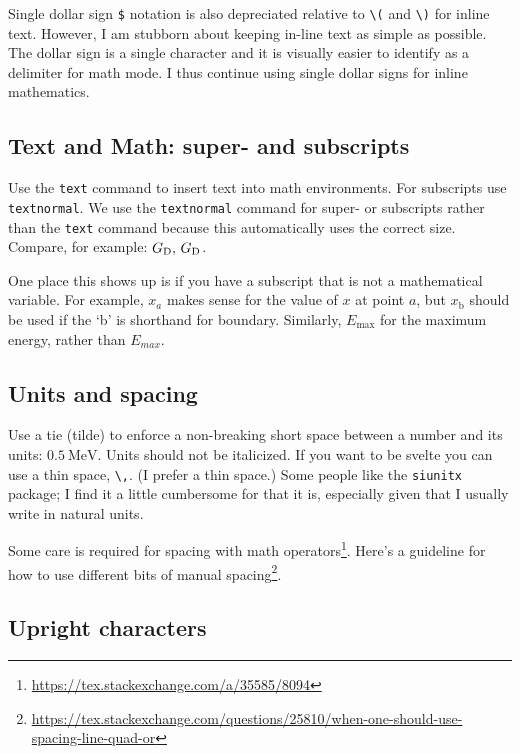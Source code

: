 Single dollar sign \verb!$! notation is also depreciated relative to \verb!\(! and \verb!\)! for inline text. However, I am stubborn about keeping in-line text as simple as possible. The dollar sign is a single character and it is visually easier to identify as a delimiter for math mode. I thus continue using single dollar signs for inline mathematics. 


\subsection{Text and Math: super- and subscripts}

Use the \texttt{text} command to insert text into math environments. For subscripts use \texttt{textnormal}. 
% 
We use the \texttt{textnormal} command for super- or subscripts rather than the \texttt{text} command because this automatically uses the correct size. Compare, for example: $G_\textnormal{D},\, G_\text{D}$.

One place this shows up is if you have a subscript that is not a mathematical variable. For example, $x_a$ makes sense for the value of $x$ at point $a$, but $x_\text{b}$ should be used if the `b' is shorthand for boundary. Similarly, $E_\text{max}$ for the maximum energy, rather than $E_{max}$.


\subsection{Units and spacing}

Use a tie (tilde) to enforce a non-breaking short space between a number and its units: $0.5~\text{MeV}$. Units should not be italicized. If you want to be svelte you can use a thin space, \verb!\,!. (I prefer a thin space.) Some people like the \texttt{siunitx} package; I find it a little cumbersome for that it is, especially given that I usually write in natural units.

Some care is required for spacing with math operators\footnote{\url{https://tex.stackexchange.com/a/35585/8094}}. Here's a guideline for how to use different bits of manual spacing\footnote{\url{https://tex.stackexchange.com/questions/25810/when-one-should-use-spacing-line-quad-or}}.


\subsection{Upright characters}

